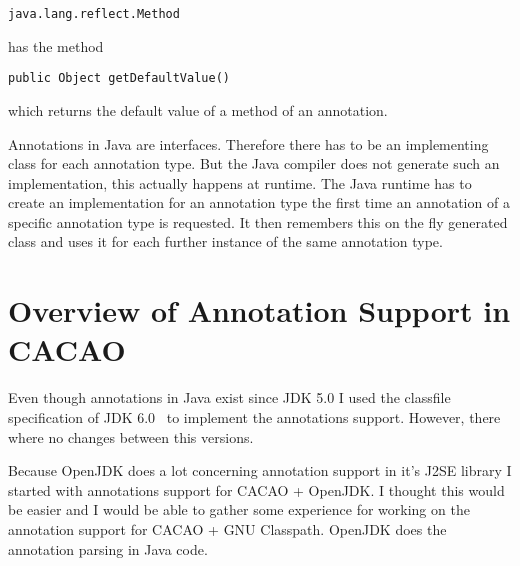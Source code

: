 \documentclass[a4paper, 10pt, titlepage]{scrartcl} %
\begin{document}
\begin{scriptsize}\verb|java|\hspace{0.0pt}\verb|.|\hspace{0.0pt}\verb|lang|\hspace{0.0pt}\verb|.|\hspace{0.0pt}\verb|reflect|\hspace{0.0pt}\verb|.|\hspace{0.0pt}\verb|Method|\end{scriptsize} has the method \begin{scriptsize}\verb|public|\hspace{0.0pt}\verb| |\hspace{0.0pt}\verb|Object|\hspace{0.0pt}\verb| |\hspace{0.0pt}\verb|getDefaultValue|\hspace{0.0pt}\verb|(|\hspace{0.0pt}\verb||\hspace{0.0pt}\verb|)|\hspace{0.0pt}\verb||\end{scriptsize}
which returns the default value of a method of an annotation.

Annotations in Java are interfaces. Therefore there has to be an implementing
class for each annotation type. But the Java compiler does not generate such an
implementation, this actually happens at runtime. The Java runtime has to
create an implementation for an annotation type the first time an annotation of
a specific annotation type is requested. It then remembers this on the fly
generated class and uses it for each further instance of the same annotation
type.

\section{Overview of Annotation Support in CACAO}
\label{sec:annotations-cacao-overview}
Even though annotations in Java exist since JDK 5.0 I used the classfile
specification of JDK 6.0~\cite{JSR202}
to implement the annotations support. However, there where no changes between
this versions.

Because OpenJDK does a lot concerning annotation support in it's J2SE library
I started with annotations support for CACAO + OpenJDK. I thought this would be
easier and I would be able to gather some experience for working on the
annotation support for CACAO + GNU Classpath. OpenJDK does the annotation
parsing in Java code.
\end{document}
